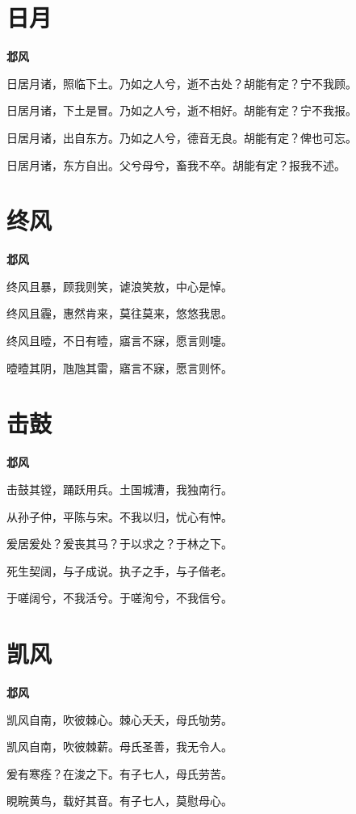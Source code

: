 \documentclass[12pt,a4paper]{ctexbook}
\begin{document}
\section{日月}
\textbf{邶风}\par\vspace{0.5em}
日居月诸，照临下土。乃如之人兮，逝不古处？胡能有定？宁不我顾。\par
日居月诸，下土是冒。乃如之人兮，逝不相好。胡能有定？宁不我报。\par
日居月诸，出自东方。乃如之人兮，德音无良。胡能有定？俾也可忘。\par
日居月诸，东方自出。父兮母兮，畜我不卒。胡能有定？报我不述。\par

\section{终风}
\textbf{邶风}\par\vspace{0.5em}
终风且暴，顾我则笑，谑浪笑敖，中心是悼。\par
终风且霾，惠然肯来，莫往莫来，悠悠我思。\par
终风且曀，不日有曀，寤言不寐，愿言则嚏。\par
曀曀其阴，虺虺其雷，寤言不寐，愿言则怀。\par

\section{击鼓}
\textbf{邶风}\par\vspace{0.5em}
击鼓其镗，踊跃用兵。土国城漕，我独南行。\par
从孙子仲，平陈与宋。不我以归，忧心有忡。\par
爰居爰处？爰丧其马？于以求之？于林之下。\par
死生契阔，与子成说。执子之手，与子偕老。\par
于嗟阔兮，不我活兮。于嗟洵兮，不我信兮。\par

\section{凯风}
\textbf{邶风}\par\vspace{0.5em}
凯风自南，吹彼棘心。棘心夭夭，母氏劬劳。\par
凯风自南，吹彼棘薪。母氏圣善，我无令人。\par
爰有寒痊？在浚之下。有子七人，母氏劳苦。\par
睍睆黄鸟，载好其音。有子七人，莫慰母心。\par
\end{document}
